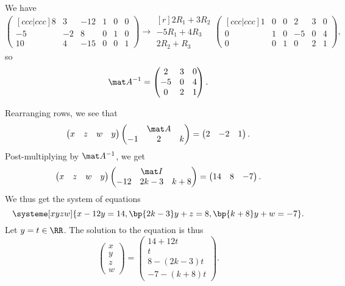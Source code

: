 \begin{solution}
    \begin{ppart}
        We have \[\begin{pmatrix}[ccc|ccc]8 & 3 & -12 & 1 & 0 & 0 \\ -5 & -2 & 8 & 0 & 1 & 0 \\ 10 & 4 & -15 & 0 & 0 & 1\end{pmatrix} \rightarrow \begin{matrix}[r] \scriptstyle 2R_1 + 3R_2 \\ \scriptstyle -5R_1 + 4R_3 \\ \scriptstyle 2R_2 + R_3\end{matrix} \begin{pmatrix}[ccc|ccc]1 & 0 & 0 & 2 & 3 & 0 \\ 0 & 1 & 0 & -5 & 0 & 4 \\ 0 & 0 & 1 & 0 & 2 & 1\end{pmatrix},\] so \[\mat A^{-1} = \begin{pmatrix}2 & 3 & 0 \\ -5 & 0 & 4 \\ 0 & 2 & 1\end{pmatrix}.\]
    \end{ppart}
    \begin{ppart}
        Rearranging rows, we see that \[\begin{pmatrix}x & z & w & y\end{pmatrix} \begin{pmatrix} & \mat A & \\ -1 & 2 & k\end{pmatrix} = \begin{pmatrix}2 & -2 & 1\end{pmatrix}.\] Post-multiplying by $\mat A^{-1}$, we get \[\begin{pmatrix}x & z & w & y\end{pmatrix} \begin{pmatrix} & \mat I & \\ -12 & 2k-3 & k+8 \end{pmatrix} = \begin{pmatrix}14 & 8 & -7\end{pmatrix}.\] We thus get the system of equations \[\systeme[xyzw]{x - 12y = 14, \bp{2k-3}y + z = 8, \bp{k+8}y + w = -7}.\] Let $y = t \in \RR$. The solution to the equation is thus \[\begin{pmatrix}x \\ y \\ z \\ w\end{pmatrix} = \begin{pmatrix}14+12t \\ t \\ 8-(2k-3)t \\ -7-(k+8)t\end{pmatrix}.\]
    \end{ppart}
\end{solution}

